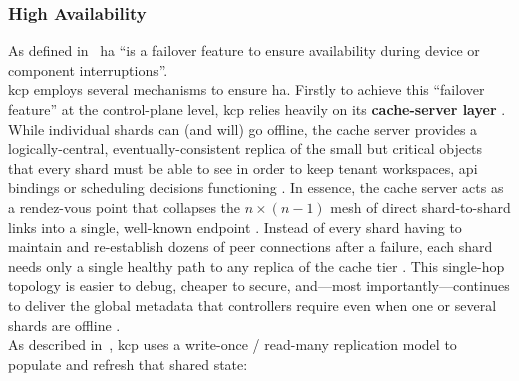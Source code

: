 \documentclass[11pt, a4paper, oneside, listof=totoc]{scrartcl}
\begin{document}
            \subsubsection{High Availability}\label{subsubsec:highAvailability}
                As defined in~\cite[p.~3-3]{nist800-113} \gls{ha} \enquote{is a failover feature to
                ensure availability during device or component interruptions}.
                \\
                \gls{kcp} employs several mechanisms to ensure \gls{ha}.
                Firstly to achieve this \enquote{failover feature} at the control-plane level, \gls{kcp}
                relies heavily on its \textbf{cache-server layer}
                \parencite{kcpShardingCacheServer}.
                While individual shards can (and will) go offline, the cache server provides a
                logically-central, eventually-consistent replica of the small but critical objects
                that every shard must be able to see in order to keep tenant workspaces, \gls{api}
                bindings or scheduling decisions functioning \parencite{kcpShardingCacheServer}.
                In essence, the cache server acts as a rendez-vous point that collapses the
                \( n \times (n - 1) \) mesh of direct shard-to-shard links into a single, well-known
                endpoint \parencite{kcpShardingCacheServer}.
                Instead of every shard having to maintain and re-establish dozens of peer
                connections after a failure, each shard needs only a single healthy path to any
                replica of the cache tier \parencite{kcpShardingCacheServer}.
                This single-hop topology is easier to debug, cheaper to secure, and—most
                importantly—continues to deliver the global metadata that controllers require even
                when one or several shards are offline \parencite{kcpShardingCacheServer}.
                \\
                As described in~\cite{kcpShardingCacheServer}, \gls{kcp} uses a write-once /
                read-many replication model to populate and refresh that shared state:
\end{document}
